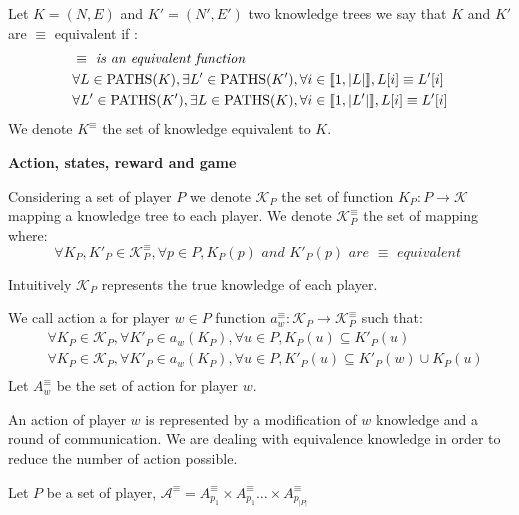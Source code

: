 \begin{mydef}
	Let $K = (N,E)$ and $K'=(N',E')$ two knowledge trees we say that $K$ and $K'$ are $\equiv$ equivalent if :
	\begin{eqnarray*}
		& \equiv \textit{ is an equivalent function} \\
		& \forall L \in \text{PATHS}(K), \exists L' \in \text{PATHS}(K'), \forall i \in \llbracket 1,|L| \rrbracket, L[i] \equiv L'[i] \\
		& \forall L' \in \text{PATHS}(K'), \exists L \in \text{PATHS}(K), \forall i \in \llbracket 1,|L'| \rrbracket, L[i] \equiv L'[i] \\
	\end{eqnarray*}	
	We denote $K^{\equiv}$ the set of knowledge equivalent to $K$. 
\end{mydef}


\medskip
\noindent
\textbf{Action, states, reward and game}
\begin{mydef}
	Considering a set of player $P$ we denote $\mathcal{K}_P$ the set of function $K_P : P \rightarrow \mathcal{K}$ mapping a knowledge tree to each player. 
	We denote $\mathcal{K}^{\equiv}_P$ the set of mapping where:
	$$\forall K_P, K'_P \in \mathcal{K}^{\equiv}_P, \forall p \in P, K_P(p) \textit{ and } K'_P(p) \textit{ are } \equiv \textit{ equivalent } $$ 
\end{mydef}

Intuitively $\mathcal{K}_P$ represents the true knowledge of each player.

\begin{mydef}
	We call action a for player $w\in P$ function $a^\equiv_w: \mathcal{K}_P \rightarrow \mathcal{K}_P^{\equiv}$ such that: 
	\begin{eqnarray*}	
		&\forall K_P \in \mathcal{K}_P, \forall K'_P \in a_w(K_P),  \forall u \in P, K_P(u) \subseteq K'_P(u)  \\
		&\forall K_P \in \mathcal{K}_P, \forall K'_P \in a_w(K_P), \forall u \in P, K'_P(u) \subseteq K'_P(w) \cup K_P(u)  \\
	\end{eqnarray*}
	Let $A^\equiv_w$ be the set of action for player $w$.
\end{mydef}
An action of player $w$ is represented by a modification of $w$ knowledge and a round of communication. We are dealing with equivalence knowledge in order to reduce the number of action possible.

\begin{mydef}
	Let $P$ be a set of player, $\mathcal{A}^\equiv = A_{p_1}^\equiv \times A_{p_1}^\equiv \ldots \times A_{p_{|P|}}^\equiv$
\end{mydef}

